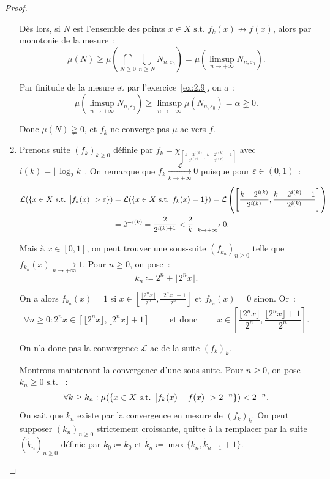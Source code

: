 \documentclass{article}
\newcommand{\pinfty}{{+\infty}}
\newcommand{\st}{\text{ s.t. }}
\begin{document}
\begin{proof}
\begin{enumerate}
	Dès lors, si $N$ est l'ensemble des points $x \in X \st f_k(x) \not \to f(x)$, alors par monotonie de la mesure~:
	\[\mu(N) \geq \mu\left(\bigcap_{N \geq 0}\bigcup_{n \geq N}N_{n,\varepsilon_0}\right) = \mu\left(\limsup_{n \to \pinfty}N_{n,\varepsilon_0}\right).\]

	Par finitude de la mesure et par l'exercice~\ref{ex:2.9}, on a~:
	\[\mu\left(\limsup_{n \to \pinfty}N_{n,\varepsilon_0}\right) \geq \limsup_{n \to \pinfty}\mu(N_{n,\varepsilon_0}) = \alpha \gneqq 0.\]

	Donc $\mu(N) \gneqq 0$, et $f_k$ ne converge pas $\mu$-ae vers $f$.

	\item Prenons suite $(f_k)_{k \geq 0}$ définie par $f_k = \chi_{\left[\frac {k-2^{i(k)}}{2^{i(k)}}, \frac {k-2^{i(k)}-1}{2^{i(k)}}\right]}$ avec $i(k) = \lfloor\log_2k\rfloor$.
	On remarque que $f_k \xrightarrow[k \to \pinfty]{\mathcal L} 0$ puisque pour $\varepsilon \in (0, 1)$~:
	\begin{align*}
		\mathcal L(\{x \in X \st \abs {f_k(x)} > \varepsilon\}) &= \mathcal L(\{x \in X \st f_k(x) = 1\})
			= \mathcal L\left(\left[\frac {k-2^{i(k)}}{2^{i(k)}}, \frac {k-2^{i(k)}-1}{2^{i(k)}}\right]\right) \\
		&= 2^{-i(k)} = \frac 2{2^{i(k)+1}} < \frac 2k \xrightarrow[k \to \pinfty]{} 0.
	\end{align*}

	Mais à $x \in [0, 1]$, on peut trouver une sous-suite $(f_{k_n})_{n \geq 0}$ telle que $f_{k_n}(x) \xrightarrow[n \to \pinfty]{} 1$. Pour $n \geq 0$, on pose~:
	\[k_n \coloneqq 2^n + \lfloor2^nx\rfloor.\]

	On a alors $f_{k_n}(x) = 1$ si $x \in \left[\frac {\lfloor2^nx\rfloor}{2^n}, \frac {\lfloor2^nx\rfloor+1}{2^n}\right]$ et $f_{k_n}(x) = 0$ sinon. Or~:
	\[\forall n \geq 0 : 2^nx \in \left[\lfloor2^nx\rfloor, \lfloor2^nx\rfloor+1\right]
	\qquad\text{ et donc }\qquad x \in \left[\frac {\lfloor2^nx\rfloor}{2^n}, \frac {\lfloor2^nx\rfloor+1}{2^n}\right].\]

	On n'a donc pas la convergence $\mathcal L$-ae de la suite $(f_k)_k$.

	Montrons maintenant la convergence d'une sous-suite. Pour $n \geq 0$, on pose $k_n \geq 0 \st$~:
	\[\forall k \geq k_n : \mu(\{x \in X \st \abs {f_k(x)-f(x)} > 2^{-n}\}) < 2^{-n}.\]
	On sait que $k_n$ existe par la convergence en mesure de $(f_k)_k$. On peut supposer $(k_n)_{n \geq 0}$ strictement croissante, quitte à la remplacer par la suite
	$(\tilde k_n)_{n \geq 0}$ définie par $\tilde k_0 \coloneqq k_0$ et $\tilde k_n \coloneqq \max\{k_n, \tilde k_{n-1}+1\}$.


\end{enumerate}
\end{proof}
\end{document}

